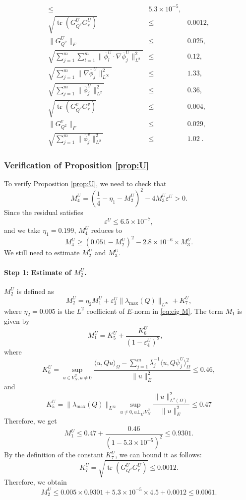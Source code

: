 \documentclass[11pt,a4paper]{article}
\numberwithin{equation}{section}
\newcommand{\cdummy}{\cdot}
\newcommand{\tmop}[1]{\ensuremath{\operatorname{#1}}}
\begin{document}
\begin{eqnarray}
  \leqslant & 5.3 \times 10^{- 5},\\
  \sqrt{\tmop{tr} (G_{Q^2}^U G_r^U)} & \leqslant & 0.0012,\\
  \|G^U_{Q^2} \| _F & \leqslant & 0.025,\\
  \sqrt{\sum_{j = 1}^m \sum_{l = 1}^m \| \overline{\phi}_l^U \cdummy \nabla
  \overline{\phi}_j^U \|^2_{L^2}} & \leqslant & 0.12,\\
  \sqrt{\sum_{j = 1}^m \| \nabla \overline{\phi}_j^U \|^2_{L^{\infty}}} &
  \leqslant & 1.33,\\
  \sqrt{\sum_{j = 1}^m \| \overline{\phi}_j^U \|^2_{L^2}} & \leqslant & 0.36, \\
    \sqrt{\tmop{tr} (G_{Q^2}^v G_r^v)} & \leqslant & 0.004,\\
  \|G^v_{Q^2} \| _F & \leqslant & 0.029,\\
  \sqrt{\sum_{j = 1}^m \| \overline{\phi}_j^v \|^2_{L^2}} & \leqslant & 1.02 \; .
\end{eqnarray}


\subsubsection{Verification of Proposition \ref{prop:U}}

To verify Proposition \ref{prop:U}, we need to check that
\[ M_4^U = (\frac{1}{4} - \eta_1 - M_2^U)^2 - 4 M_3^U \varepsilon^U > 0. \]
Since the residual satisfies
\[ \varepsilon^U \leqslant 6.5 \times 10^{- 7}, \]
and we take $\eta_1 = 0.199$, $M_4^U$ reduces to
\[ M_4^U \geqslant (0.051 - M_2^U)^2 - 2.8 \times 10^{- 6} \times M_3^U . \]
We still need to estimate $M_2^U$ and $M_3^U$.

\paragraph{Step 1: Estimate of $M_2^U$.}

$M_2^U$ is defined as
\[ M_2^U = \eta_2 M_1^U + \varepsilon^U_3 \| \lambda_{\max} (Q) \|_{L^\infty} +
   K_7^U, \]
where $\eta_2 = 0.005$ is the $L^2$ coefficient of $E$-norm in \eqref{eq:eig M}.
The term $M_1$ is given by
\[ M_1^U = K^U_5 + \frac{K_6^U}{(1 - \varepsilon^U_4)^2}, \quad \]
where
\[ K_6^U = \sup_{u \in V_N^{U}, u \neq 0}  \frac{\langle u, Qu
   \rangle_{\Omega} - \sum_{j = 1}^m \overline{\lambda}_j^{- 1}  \langle u, Q
   \overline{\psi}_j^{ U} \rangle_{\Omega}^2}{\|u\|^2_E} \leqslant 0.46, \]
and
\[
    K^U_5 = \| \lambda_{\max} (Q)\|_{L^\infty} \sup_{u \neq 0, u
   \bot_{L^2} V^U_N}  \frac{\|u\|^2_{L^2(\Omega)}}{\|u\|^2_E} \leqslant 0.47
\]
Therefore, we get
\[ M_1^U \leqslant 0.47 + \frac{0.46}{(1 - 5.3 \times 10^{-5})^2} \leqslant 0.9301. \]
By the definition of the constant $K_7^U$, we can bound it as follows:
\[ K_7^U = \sqrt{\tmop{tr} (G^U_{Q^2} G^U_r)} \leqslant 0.0012. \]
Therefore, we obtain
\[ M_2^U \leqslant 0.005 \times 0.9301 + 5.3 \times 10^{-5} \times 4.5 + 0.0012
   \leqslant 0.0061. \]
\end{document}
